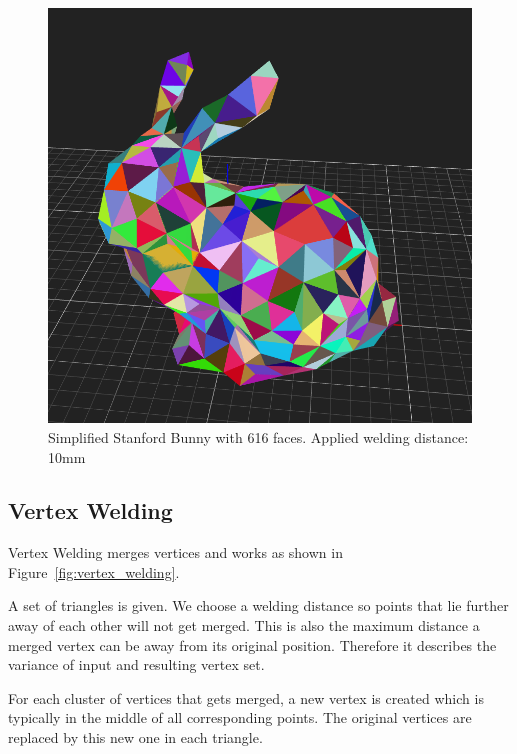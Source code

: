 \documentclass[../ClassicThesis.tex]{subfiles}
\begin{document}
\begin{figure}
\includegraphics[width=0.8\columnwidth]{Images/04-approx-welding-rabbit-10mm.png}
\caption{Simplified Stanford Bunny with 616 faces. Applied welding distance: 10mm}
\label{fig:10mmBunny}
\end{figure}




\subsection{Vertex Welding}
\label{sec:vertex_welding}










Vertex Welding merges vertices and works as shown in Figure~\ref{fig:vertex_welding}.

A set of triangles is given. We choose a welding distance so points that lie further away of each other will not get merged. This is also the maximum distance a merged vertex can be away from its original position. Therefore it describes the variance of input and resulting vertex set.

For each cluster of vertices that gets merged, a new vertex is created which is typically in the middle of all corresponding points. The original vertices are replaced by this new one in each triangle.
\end{document}
